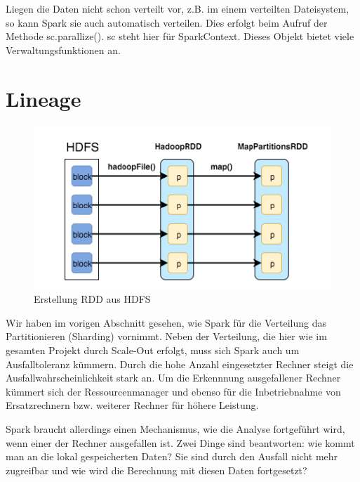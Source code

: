 Liegen die Daten nicht schon verteilt vor, z.B. im einem verteilten
Dateisystem, so kann Spark sie auch automatisch verteilen. Dies erfolgt
beim Aufruf der Methode sc.parallize(). sc steht hier für SparkContext.
Dieses Objekt bietet viele Verwaltungsfunktionen an. 

\section[Lineage]{\rmfamily Lineage}
\begin{figure}
\centering
\includegraphics[width=\textwidth]{bilder/Seminartext-img1.png}
\caption{Erstellung RDD aus HDFS \cite{SparkInternals}} 
\end{figure}
Wir haben im vorigen Abschnitt gesehen, wie Spark für die Verteilung das
Partitionieren (Sharding) vornimmt. Neben der Verteilung, die hier wie
im gesamten Projekt durch Scale-Out erfolgt, muss sich Spark auch um
Ausfalltoleranz kümmern. Durch die hohe Anzahl eingesetzter Rechner
steigt die Ausfallwahrscheinlichkeit stark an. Um die Erkennnung
ausgefallener Rechner kümmert sich der Ressourcenmanager und ebenso für
die Inbetriebnahme von Ersatzrechnern bzw. weiterer Rechner für höhere
Leistung.

Spark braucht allerdings einen Mechanismus, wie die Analyse fortgeführt
wird, wenn einer der Rechner ausgefallen ist. Zwei Dinge sind
beantworten: wie kommt man an die lokal gespeicherten Daten? Sie sind durch
den Ausfall nicht mehr zugreifbar und wie wird die Berechnung mit
diesen Daten fortgesetzt?

